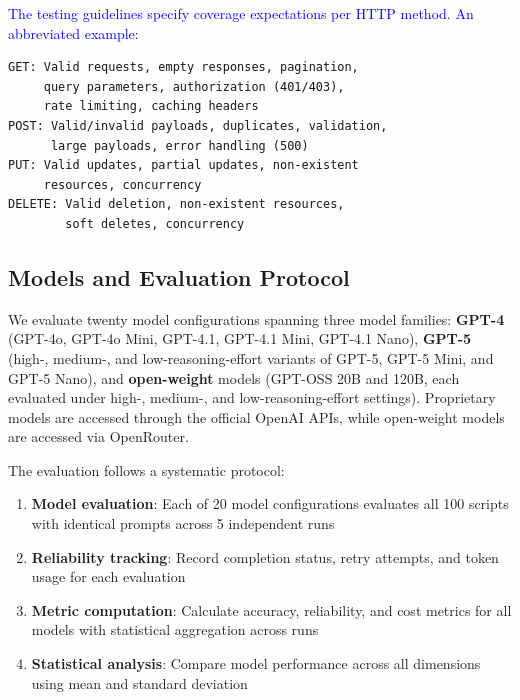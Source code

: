 \documentclass[letterpaper]{article} %
\newcommand{\add}[1]{\textcolor{blue}{#1}}
\newcommand{\add}[1]{#1}
\begin{document}
\add{The testing guidelines specify coverage expectations per HTTP method. An abbreviated example:}

\begin{verbatim}
GET: Valid requests, empty responses, pagination, 
     query parameters, authorization (401/403), 
     rate limiting, caching headers
POST: Valid/invalid payloads, duplicates, validation, 
      large payloads, error handling (500)
PUT: Valid updates, partial updates, non-existent 
     resources, concurrency
DELETE: Valid deletion, non-existent resources, 
        soft deletes, concurrency
\end{verbatim}



\subsection{Models and Evaluation Protocol}
We evaluate twenty model configurations spanning three model families: \textbf{GPT-4} (GPT-4o, GPT-4o Mini, GPT-4.1, GPT-4.1 Mini, GPT-4.1 Nano), \textbf{GPT-5} (high-, medium-, and low-reasoning-effort variants of GPT-5, GPT-5 Mini, and GPT-5 Nano), and \textbf{open-weight} models (GPT-OSS 20B and 120B, each evaluated under high-, medium-, and low-reasoning-effort settings). Proprietary models are accessed through the official OpenAI APIs, while open-weight models are accessed via OpenRouter. 

The evaluation follows a systematic protocol:

\begin{enumerate}[nosep]
  \item \textbf{Model evaluation}: Each of 20 model configurations evaluates all 100 scripts with identical prompts across 5 independent runs
  \item \textbf{Reliability tracking}: Record completion status, retry attempts, and token usage for each evaluation
  \item \textbf{Metric computation}: Calculate accuracy, reliability, and cost metrics for all models with statistical aggregation across runs
  \item \textbf{Statistical analysis}: Compare model performance across all dimensions using mean and standard deviation
\end{enumerate}
\end{document}
